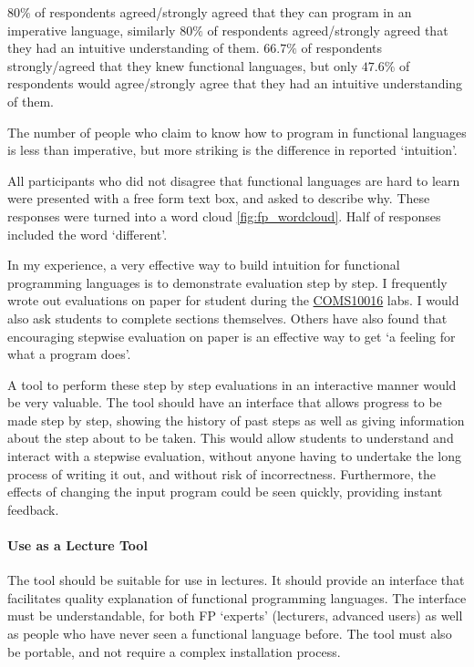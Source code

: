 $80\%$ of respondents agreed/strongly agreed that they can program in an imperative language, similarly $80\%$ of respondents agreed/strongly agreed that they had an intuitive understanding of them. $66.7\%$ of respondents strongly/agreed that they knew functional languages, but only $47.6\%$ of respondents would agree/strongly agree that they had an intuitive understanding of them.

The number of people who claim to know how to program in functional languages is less than imperative, but more striking is the difference in reported `intuition'. 

All participants who did not disagree that functional languages are hard to learn were presented with a free form text box, and asked to describe why. These responses were turned into a word cloud \ref{fig:fp_wordcloud}. Half of responses included the word `different'. 

In my experience, a very effective way to build intuition for functional programming languages is to demonstrate evaluation step by step. I frequently wrote out evaluations on paper for student during the \hyperref[COMS10016]{COMS10016} labs. I would also ask students to complete sections themselves. Others have also found that encouraging stepwise evaluation on paper is an effective way to get `a feeling for what a program does'. \cite{fp_first_year}

A tool to perform these step by step evaluations in an interactive manner would be very valuable. The tool should have an interface that allows progress to be made step by step, showing the history of past steps as well as giving information about the step about to be taken. This would allow students to understand and interact with a stepwise evaluation, without anyone having to undertake the long process of writing it out, and without risk of incorrectness. Furthermore, the effects of changing the input program could be seen quickly, providing instant feedback. 

\paragraph{Use as a Lecture Tool} The tool should be suitable for use in lectures. It should provide an interface that facilitates quality explanation of functional programming languages. The interface must be understandable, for both \ac{FP} `experts' (lecturers, advanced users) as well as people who have never seen a functional language before. The tool must also be portable, and not require a complex installation process. 

